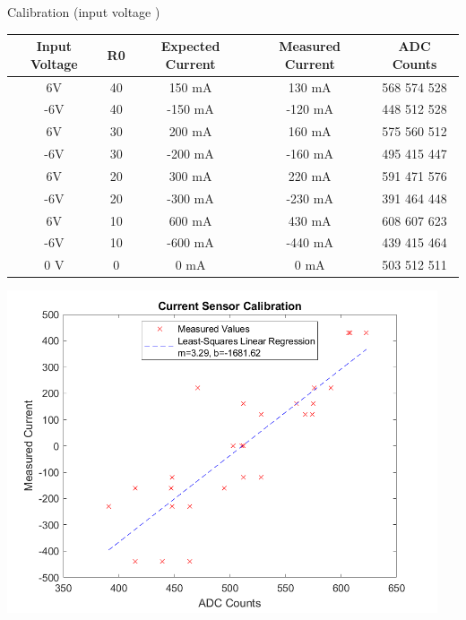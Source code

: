 \documentclass[12pt]{article}
\begin{document}
Calibration (input voltage )

\begin{center}
\begin{tabular}{|c|c|c|c|c|}
    \hline
    Input Voltage & R0 & Expected Current & Measured Current & ADC Counts \\
    \hline
    6V & 40 & 150 mA & 130 mA & 568 574 528 \\
    \hline
    -6V & 40 & -150 mA & -120 mA & 448 512 528\\
    \hline
    6V & 30 & 200 mA & 160 mA & 575 560 512 \\
    \hline
    -6V & 30 & -200 mA & -160 mA & 495 415 447 \\
    \hline
    6V & 20 & 300 mA & 220 mA & 591 471 576 \\
    \hline
    -6V & 20 & -300 mA & -230 mA & 391 464 448 \\
    \hline
    6V & 10 & 600 mA & 430 mA & 608 607 623 \\
    \hline
    -6V & 10 & -600 mA & -440 mA & 439 415 464 \\
    \hline
    0 V & 0 & 0 mA & 0 mA & 503 512 511 \\
    \hline
\end{tabular}
\end{center}

\begin{center}
    \includegraphics[width=5in]{current_sensor_calibration_curve.png}
\end{center}
\end{document}
